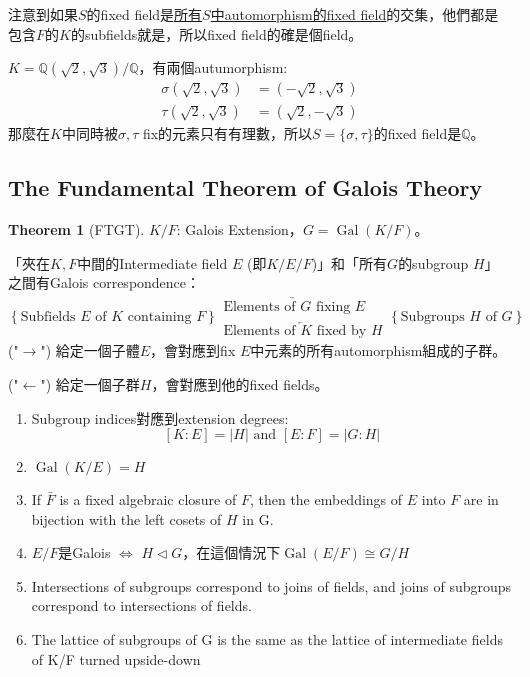 \documentclass[12pt]{article}
\theoremstyle{definition}
\newtheorem{thm}{Theorem}
\newcommand{\QQ}{\mathbb Q}
\DeclareMathOperator{\Gal}{Gal}
\begin{document}
注意到如果$S$的fixed field是\underline{所有$S$中automorphism的fixed field}的交集，他們都是包含$F$的$K$的subfields就是，所以fixed field的確是個field。

\begin{ex}
	$K=\QQ(\sqrt{2},\sqrt{3})/\QQ$，有兩個autumorphism:
	\begin{align*}
		\sigma(\sqrt2,\sqrt3) & =(-\sqrt2,\sqrt3) \\
		\tau(\sqrt2,\sqrt3)&=(\sqrt2,-\sqrt3)
	\end{align*}
	那麼在$K$中同時被$\sigma, \tau$ fix的元素只有有理數，所以$S=\{\sigma,\tau\}$的fixed field是$\QQ$。
\end{ex}

\subsection{The Fundamental Theorem of Galois Theory}

\begin{thm}[FTGT]\leavevmode
	$K/F$: Galois Extension，$G=\Gal(K/F)$。

	「夾在$K,F$中間的Intermediate field $E$ (即$K/E/F$)」和「所有$G$的subgroup $H$」之間有Galois correspondence：
	\[
		\left\{\text{Subfields $E$ of $K$ containing $F$}\right\}
		\begin{matrix}
			\underrightarrow{\text{Elements of $G$ fixing $E$}} \\
			\underleftarrow{\text{Elements of $K$ fixed by $H$}}
		\end{matrix}
		\left\{\text{Subgroups $H$ of $G$}\right\}
	\]
	\noindent ("$\rightarrow$") 給定一個子體$E$，會對應到fix $E$中元素的所有automorphism組成的子群。

	\noindent ("$\leftarrow$") 給定一個子群$H$，會對應到他的fixed fields。

	\begin{enumerate}
		\item Subgroup indices對應到extension degrees:
		\[[K:E]=|H|\text{ and }[E:F]=|G:H|\]
		\item $\Gal(K/E)=H$
		\item If $\bar{F}$ is a fixed algebraic closure of $F$, then the embeddings of $E$ into
		      $F$ are in bijection with the left cosets of $H$ in G.
		\item $E/F$是Galois $\iff$ $H\lhd G$，在這個情況下$\Gal(E/F)\cong G/H$
		\item  Intersections of subgroups correspond to joins of fields, and joins of
		      subgroups correspond to intersections of fields.
		\item  The lattice of subgroups of G is the same as the lattice of
		      intermediate fields of K/F turned upside-down
	\end{enumerate}
\end{thm}
\end{document}
